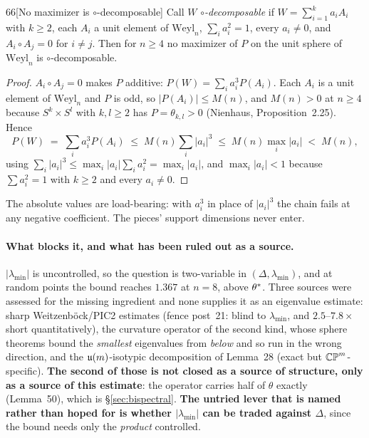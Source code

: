 \begin{Lem}{66}[No maximizer is $\circ$-decomposable]
Call $W$ \emph{$\circ$-decomposable} if $W=\sum_{i=1}^ka_iA_i$ with $k\ge2$, each $A_i$ a unit element of $\mathrm{Weyl}_n$, $\sum_ia_i^2=1$, every $a_i\ne0$, and $A_i\circ A_j=0$ for $i\ne j$. Then for $n\ge4$ no maximizer of $P$ on the unit sphere of $\mathrm{Weyl}_n$ is $\circ$-decomposable.
\end{Lem}

\begin{proof}
$A_i\circ A_j=0$ makes $P$ additive: $P(W)=\sum_ia_i^3P(A_i)$. Each $A_i$ is a unit element of $\mathrm{Weyl}_n$ and $P$ is odd, so $\lvert P(A_i)\rvert\le M(n)$, and $M(n)>0$ at $n\ge4$ because $S^k\times S^l$ with $k,l\ge2$ has $P=\theta_{k,l}>0$ (Nienhaus, Proposition~2.25). Hence
\[
P(W)\;=\;\sum_ia_i^3P(A_i)\;\le\;M(n)\sum_i\lvert a_i\rvert^3\;\le\;M(n)\max_i\lvert a_i\rvert\;<\;M(n),
\]
using $\sum_i\lvert a_i\rvert^3\le\max_i\lvert a_i\rvert\sum_ia_i^2=\max_i\lvert a_i\rvert$, and $\max_i\lvert a_i\rvert<1$ because $\sum a_i^2=1$ with $k\ge2$ and every $a_i\ne0$.
\end{proof}

The absolute values are load-bearing: with $a_i^3$ in place of $\lvert a_i\rvert^3$ the chain fails at any negative coefficient. The pieces' support dimensions never enter.


\paragraph{What blocks it, and what has been ruled out as a source.} $|\lambda_{\min}|$ is uncontrolled, so the question is two-variable in $(\Delta,\lambda_{\min})$, and at random points the bound reaches $1.367$ at $n=8$, above $\theta^{*}$. Three sources were assessed for the missing ingredient and none supplies it as an eigenvalue estimate: sharp Weitzenb\"ock/PIC2 estimates (fence post~21: blind to $\lambda_{\min}$, and $2.5$--$7.8\times$ short quantitatively), the curvature operator of the second kind, whose sphere theorems bound the \emph{smallest} eigenvalues from \emph{below} and so run in the wrong direction, and the $\mathfrak{u}(m)$-isotypic decomposition of Lemma~28 (exact but $\mathbb{CP}^m$-specific). \textbf{The second of those is not closed as a source of structure, only as a source of this estimate}: the operator carries half of $\theta$ exactly (Lemma~50), which is \S\ref{sec:bispectral}. \textbf{The untried lever that is named rather than hoped for is whether $|\lambda_{\min}|$ can be traded against $\Delta$}, since the bound needs only the \emph{product} controlled.

